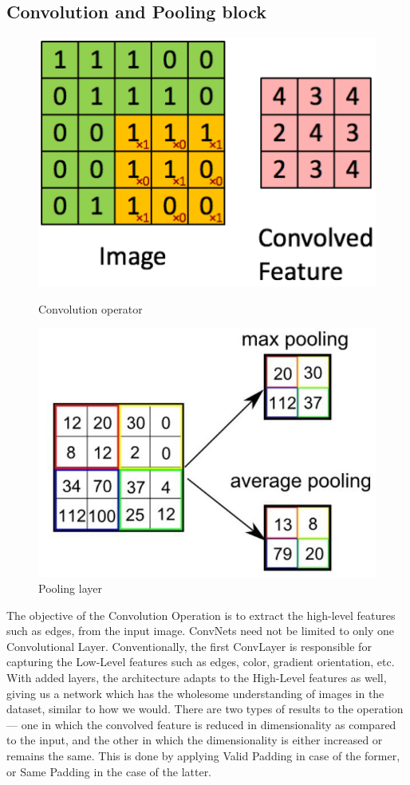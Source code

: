 \documentclass[10pt]{SelfArx} %
\begin{document}
\subsection{Convolution and Pooling block}
\begin{figure}\centering 
	\includegraphics[width=.6\linewidth]{img/conv}
	\caption{Convolution operator}		
	\includegraphics[width=.6\linewidth]{img/pooling}
	\caption{Pooling layer}	
\end{figure}
The objective of the Convolution Operation is to extract the high-level features such as edges, from the input image. ConvNets need not be limited to only one Convolutional Layer. Conventionally, the first ConvLayer is responsible for capturing the Low-Level features such as edges, color, gradient orientation, etc. With added layers, the architecture adapts to the High-Level features as well, giving us a network which has the wholesome understanding of images in the dataset, similar to how we would.
There are two types of results to the operation — one in which the convolved feature is reduced in dimensionality as compared to the input, and the other in which the dimensionality is either increased or remains the same. This is done by applying Valid Padding in case of the former, or Same Padding in the case of the latter.
\end{document}
